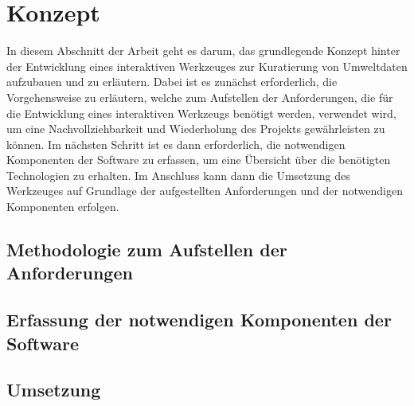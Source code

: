 \chapter{Konzept} %
In diesem Abschnitt der Arbeit geht es darum, das grundlegende Konzept hinter der Entwicklung eines interaktiven Werkzeuges zur Kuratierung von Umweltdaten aufzubauen und zu erläutern. Dabei ist es zunächst erforderlich, 
die Vorgehensweise zu erläutern, welche zum Aufstellen der Anforderungen, die für die Entwicklung eines interaktiven Werkzeugs benötigt werden, verwendet wird, um eine Nachvollziehbarkeit und Wiederholung des Projekts gewährleisten zu 
können. \newline Im nächsten Schritt ist es dann erforderlich, die notwendigen Komponenten der Software zu erfassen, um eine Übersicht über die benötigten Technologien zu erhalten. Im Anschluss kann dann die Umsetzung des Werkzeuges auf Grundlage 
der aufgestellten Anforderungen und der notwendigen Komponenten erfolgen.

\section{Methodologie zum Aufstellen der Anforderungen}

\section{Erfassung der notwendigen Komponenten der Software}

\section{Umsetzung}
